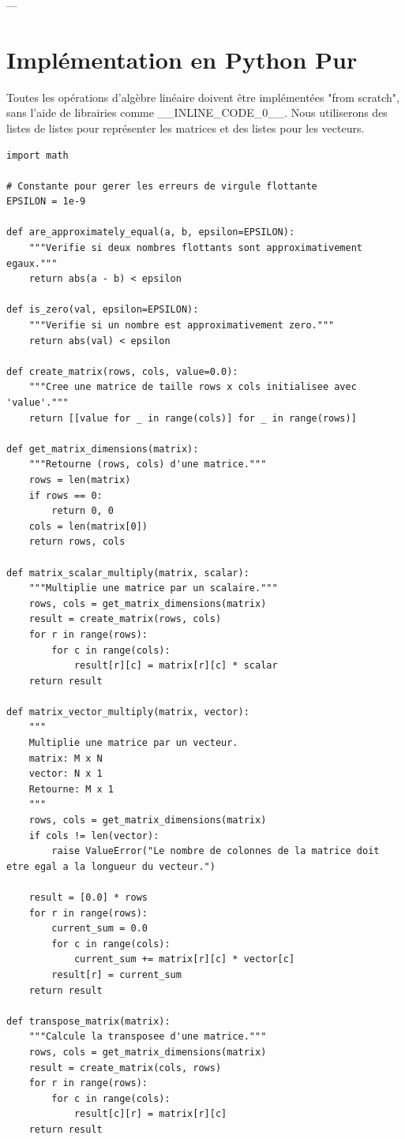 \documentclass{report}
\begin{document}
---

\section*{Implémentation en Python Pur}

Toutes les opérations d'algèbre linéaire doivent être implémentées "from scratch", sans l'aide de librairies comme \_\_INLINE\_CODE\_0\_\_. Nous utiliserons des listes de listes pour représenter les matrices et des listes pour les vecteurs.

\begin{verbatim}
import math

# Constante pour gerer les erreurs de virgule flottante
EPSILON = 1e-9

def are_approximately_equal(a, b, epsilon=EPSILON):
    """Verifie si deux nombres flottants sont approximativement egaux."""
    return abs(a - b) < epsilon

def is_zero(val, epsilon=EPSILON):
    """Verifie si un nombre est approximativement zero."""
    return abs(val) < epsilon

def create_matrix(rows, cols, value=0.0):
    """Cree une matrice de taille rows x cols initialisee avec 'value'."""
    return [[value for _ in range(cols)] for _ in range(rows)]

def get_matrix_dimensions(matrix):
    """Retourne (rows, cols) d'une matrice."""
    rows = len(matrix)
    if rows == 0:
        return 0, 0
    cols = len(matrix[0])
    return rows, cols

def matrix_scalar_multiply(matrix, scalar):
    """Multiplie une matrice par un scalaire."""
    rows, cols = get_matrix_dimensions(matrix)
    result = create_matrix(rows, cols)
    for r in range(rows):
        for c in range(cols):
            result[r][c] = matrix[r][c] * scalar
    return result

def matrix_vector_multiply(matrix, vector):
    """
    Multiplie une matrice par un vecteur.
    matrix: M x N
    vector: N x 1
    Retourne: M x 1
    """
    rows, cols = get_matrix_dimensions(matrix)
    if cols != len(vector):
        raise ValueError("Le nombre de colonnes de la matrice doit etre egal a la longueur du vecteur.")

    result = [0.0] * rows
    for r in range(rows):
        current_sum = 0.0
        for c in range(cols):
            current_sum += matrix[r][c] * vector[c]
        result[r] = current_sum
    return result

def transpose_matrix(matrix):
    """Calcule la transposee d'une matrice."""
    rows, cols = get_matrix_dimensions(matrix)
    result = create_matrix(cols, rows)
    for r in range(rows):
        for c in range(cols):
            result[c][r] = matrix[r][c]
    return result


\end{verbatim}
\end{document}
